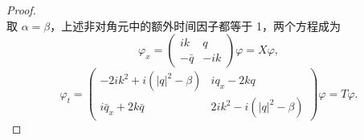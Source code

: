 \documentclass[lang=cn,scheme=chinese,mode=simple,device=normal,color=blue,
math=cm,thmcnt=section,12pt]{elegantbook}
\newcommand{\eqq}[2]{\tag{#1}\label{eq:#1}#2}
\begin{document}
\begin{proof}
\begin{equation}
    \end{equation}
    取 $\alpha=\beta$，上述非对角元中的额外时间因子都等于 1，两个方程成为
    \begin{equation}\eqq{6.2.13}{\varphi_x=\begin{pmatrix}ik&q\\-\bar q&-ik\end{pmatrix}\varphi=X\varphi,}\end{equation}
    \begin{equation}\eqq{6.2.14}{\varphi_t=\begin{pmatrix}-2ik^2+i(|q|^2-\beta)&iq_x-2kq\\i\bar q_x+2k\bar q&2ik^2-i(|q|^2-\beta)\end{pmatrix}\varphi=T\varphi.}\end{equation}


\end{proof}
\end{document}

